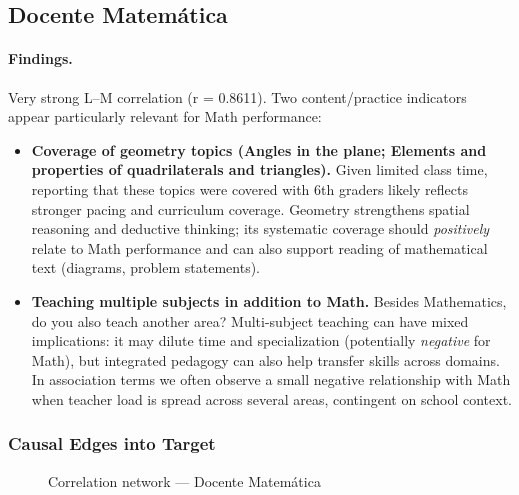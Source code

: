 \documentclass[11pt, a4paper]{article}
\begin{document}
\subsection{Docente Matemática}
\paragraph{Findings.}
Very strong L–M correlation (r = 0.8611). Two content/practice indicators appear particularly relevant for Math performance:
\begin{itemize}
  \item \textbf{Coverage of geometry topics (Angles in the plane; Elements and properties of quadrilaterals and triangles).} Given limited class time, reporting that these topics were covered with 6th graders likely reflects stronger pacing and curriculum coverage. Geometry strengthens spatial reasoning and deductive thinking; its systematic coverage should \emph{positively} relate to Math performance and can also support reading of mathematical text (diagrams, problem statements).
  \item \textbf{Teaching multiple subjects in addition to Math.} Besides Mathematics, do you also teach another area? Multi-subject teaching can have mixed implications: it may dilute time and specialization (potentially \emph{negative} for Math), but integrated pedagogy can also help transfer skills across domains. In association terms we often observe a small negative relationship with Math when teacher load is spread across several areas, contingent on school context.
\end{itemize}

\subsubsection*{Causal Edges into Target}
\begin{figure}[h]
  \centering
  \caption{Correlation network — Docente Matemática}
\end{figure}
\end{document}
